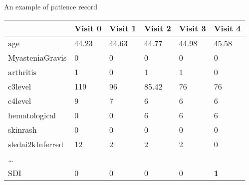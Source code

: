 
\begin{frame}{An example of patience record}
\begin{table}[H]
	\centering
	\begin{tabular}{ C{2.5cm} | C{1cm} C{1cm} C{1cm} C{1cm} C{1cm}}
		& Visit 0 & Visit 1 & Visit 2 & Visit 3 & Visit 4 \\
		\hline
		age & 44.23 & 44.63 & 44.77 & 44.98 & 45.58 \\
		MyasteniaGravis & 0 & 0 & 0 & 0 & 0 \\
		arthritis & 1 & 0 & 1 & 1 & 0 \\
		c3level & 119 & 96 & 85.42 & 76 & 76 \\
		c4level & 9 & 7 & 6 & 6 & 6 \\
		hematological & 0 & 0 & 6 & 6 & 6 \\
		skinrash & 0 & 0 & 0 & 0 & 0 \\
		sledai2kInferred & 12 & 2 & 2 & 2 & 0 \\
		\dots & & & & & \\
		\hline
		SDI & 0 & 0 & 0 & 0 & \textbf{1}\\
	\end{tabular}
\end{table}	
\end{frame}


 
